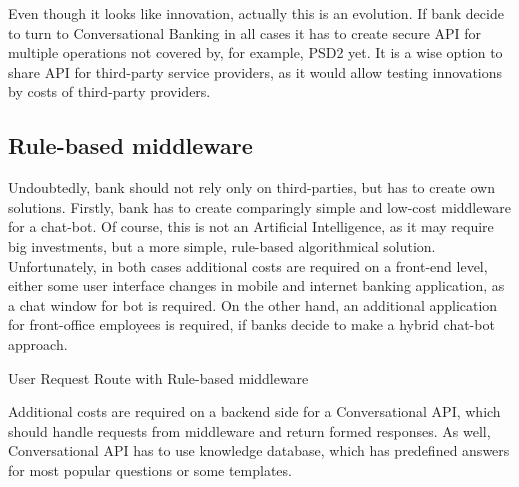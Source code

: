 Even though it looks like innovation, actually this is an evolution.
If bank decide to turn to Conversational Banking in all cases it has to create secure API for multiple operations not covered by, for example, PSD2 yet.
It is a wise option to share API for third-party service providers, as it would allow testing innovations by costs of third-party providers.


\subsection{Rule-based middleware}

Undoubtedly, bank should not rely only on third-parties, but has to create own solutions.
Firstly, bank has to create comparingly simple and low-cost middleware for a chat-bot.
Of course, this is not an Artificial Intelligence, as it may require big investments, but a more simple, rule-based algorithmical solution.
Unfortunately, in both cases additional costs are required on a front-end level, either some user interface changes in mobile and internet banking application, as a chat window for bot is required.
On the other hand, an additional application for front-office employees is required, if banks decide to make a hybrid chat-bot approach.

\begin{table}
    \centering
    \caption{User Request Route with Rule-based middleware}
    \medskip
\end{table}

Additional costs are required on a backend side for a Conversational API, which should handle requests from middleware and return formed responses.
As well, Conversational API has to use knowledge database, which has predefined answers for most popular questions or some templates.


